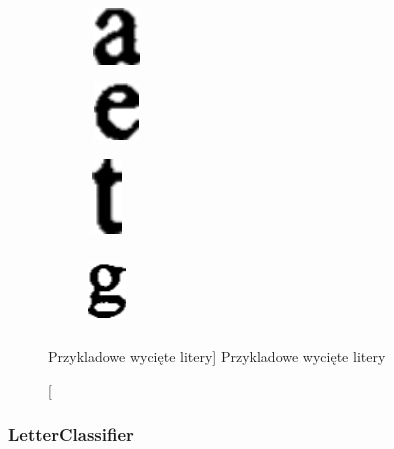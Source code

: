 \documentclass[a4paper,12pt]{article}
\begin{document}
            \begin{figure}[h!]
                \centering
                \begin{subfigure}[b]{2cm}
                    \includegraphics[width=1.5cm, height=1.5cm, frame]{image//exampleImage//letter_01.png}
                    \caption{}
                \end{subfigure}
                \begin{subfigure}[b]{2cm}
                    \includegraphics[width=1.5cm, height=1.5cm, frame]{image//exampleImage//letter_02.png}
                \caption{}
                \end{subfigure}
                \newline
                \begin{subfigure}[b]{2cm}
                    \includegraphics[width=1cm, height=2cm, frame]{image//exampleImage//letter_03.png}
                    \caption{}
                \end{subfigure}
                \begin{subfigure}[b]{2cm}
                    \includegraphics[width=1cm, height=2cm, frame]{image//exampleImage//letter_04.png}
                    \caption{}
                \end{subfigure}
                \caption
                [Przykladowe wycięte litery]
                {Przykladowe wycięte litery}
            \end{figure}

        \subsubsection{LetterClassifier}
\end{document}
